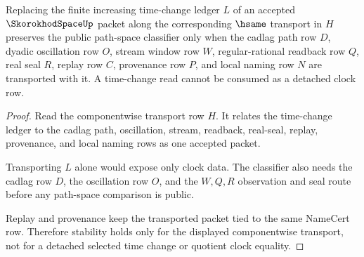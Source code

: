 \begin{theorem}
\label{thm:skorokhod-space-time-change-stability}
Replacing the finite increasing time-change ledger $L$ of an accepted $\SkorokhodSpaceUp$ packet along the corresponding $\hsame$ transport in $H$ preserves the public path-space classifier only when the cadlag path row $D$, dyadic oscillation row $O$, stream window row $W$, regular-rational readback row $Q$, real seal $R$, replay row $C$, provenance row $P$, and local naming row $N$ are transported with it. A time-change read cannot be consumed as a detached clock row.
\end{theorem}
\begin{proof}
Read the componentwise transport row $H$. It relates the time-change ledger to the cadlag path, oscillation, stream, readback, real-seal, replay, provenance, and local naming rows as one accepted packet.

Transporting $L$ alone would expose only clock data. The classifier also needs the cadlag row $D$, the oscillation row $O$, and the $W,Q,R$ observation and seal route before any path-space comparison is public.

Replay and provenance keep the transported packet tied to the same NameCert row. Therefore stability holds only for the displayed componentwise transport, not for a detached selected time change or quotient clock equality.
\end{proof}

